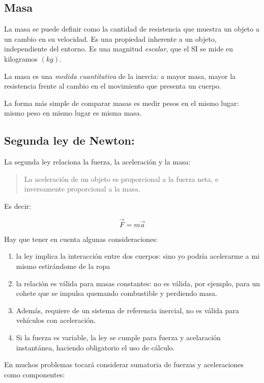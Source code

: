 \subsection{Masa}

La masa se puede definir como la cantidad de resistencia que muestra un objeto a 
un cambio en su velocidad.
Es una propiedad inherente a un objeto, independiente del entorno.
Es una magnitud \textit{escalar}, que el SI se mide en kilogramos \((kg)\).

La masa es una \textit{medida cuantitativa} de la inercia:
a mayor masa, 
mayor la resistencia frente al cambio en el movimiento que presenta un cuerpo.

La forma más simple de comparar masas es medir pesos en el mismo lugar:
mismo peso en mismo lugar es misma masa.

\subsection{Segunda ley de Newton: }

La segunda ley relaciona la fuerza, la aceleración y la masa:

\blockquote{
    La aceleración de un objeto es proporcional a la fuerza neta,
    e inversamente proporcional a la masa.
}

Es decir:

\begin{equation*}
    \vec{F} = m\vec{a}
\end{equation*}

Hay que tener en cuenta algunas consideraciones:
\begin{enumerate}
    \item la ley implica la interacción entre dos cuerpos:
    sino yo podría acelerarme a mi mismo estirándome de la ropa
    \item la relación es válida para masas constantes:
    no es válida, por ejemplo,
    para un cohete que se impulsa quemando combustible y perdiendo masa.
    \item Además,
    requiere de un sistema de referencia inercial, 
    no es válida para vehículos con aceleración.
    \item Si la fuerza es variable, la ley se cumple para fuerza y acelaración 
    instantánea, haciendo obligatorio el uso de cálculo.
\end{enumerate}

En muchos problemas tocará considerar sumatoria de fuerzas y aceleraciones 
como componentes:

